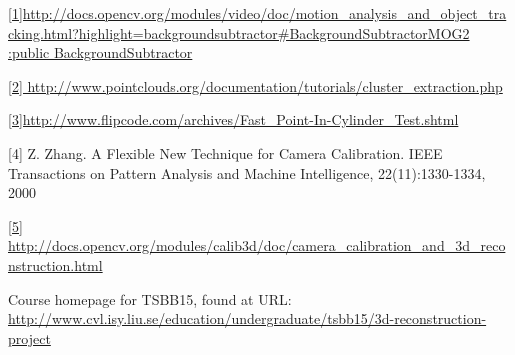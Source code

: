 \documentclass[10pt,a4paper]{article}
\begin{document}



\pagebreak
\tableofcontents
\newpage












	



\begin{thebibliography}{9}



\url{[1]http://docs.opencv.org/modules/video/doc/motion_analysis_and_object_tracking.html?highlight=backgroundsubtractor#BackgroundSubtractorMOG2 :public BackgroundSubtractor}

\url{[2] http://www.pointclouds.org/documentation/tutorials/cluster_extraction.php}

\url{[3]http://www.flipcode.com/archives/Fast_Point-In-Cylinder_Test.shtml}

[4] Z. Zhang. A Flexible New Technique for Camera Calibration. IEEE Transactions on Pattern Analysis and Machine Intelligence, 22(11):1330-1334, 2000

\url{[5] http://docs.opencv.org/modules/calib3d/doc/camera_calibration_and_3d_reconstruction.html}

Course homepage for TSBB15, found at URL:
\url{http://www.cvl.isy.liu.se/education/undergraduate/tsbb15/3d-reconstruction-project}

\end{thebibliography}

\end{document}
